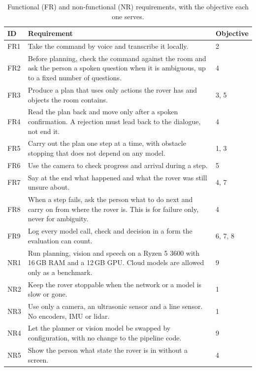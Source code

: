 \begin{table}[htbp]
  \centering
  \caption{Functional (FR) and non-functional (NR) requirements, with the objective each one serves.}
  \label{tab:requirements}
  \small
  \begin{tabular}{@{}l p{9.4cm} l@{}}
    \toprule
    ID & Requirement & Objective \\
    \midrule
    FR1 & Take the command by voice and transcribe it locally. & 2 \\
    FR2 & Before planning, check the command against the room and ask the person a spoken question when it is ambiguous, up to a fixed number of questions. & 4 \\
    FR3 & Produce a plan that uses only actions the rover has and objects the room contains. & 3, 5 \\
    FR4 & Read the plan back and move only after a spoken confirmation. A rejection must lead back to the dialogue, not end it. & 4 \\
    FR5 & Carry out the plan one step at a time, with obstacle stopping that does not depend on any model. & 1, 3 \\
    FR6 & Use the camera to check progress and arrival during a step. & 5 \\
    FR7 & Say at the end what happened and what the rover was still unsure about. & 4, 7 \\
    FR8 & When a step fails, ask the person what to do next and carry on from where the rover is. This is for failure only, never for ambiguity. & 4 \\
    FR9 & Log every model call, check and decision in a form the evaluation can count. & 6, 7, 8 \\
    NR1 & Run planning, vision and speech on a Ryzen 5 3600 with 16\,GB RAM and a 12\,GB GPU. Cloud models are allowed only as a benchmark. & 9 \\
    NR2 & Keep the rover stoppable when the network or a model is slow or gone. & 1 \\
    NR3 & Use only a camera, an ultrasonic sensor and a line sensor. No encoders, IMU or lidar. & 1 \\
    NR4 & Let the planner or vision model be swapped by configuration, with no change to the pipeline code. & 9 \\
    NR5 & Show the person what state the rover is in without a screen. & 4 \\
    \bottomrule
  \end{tabular}
\end{table}

